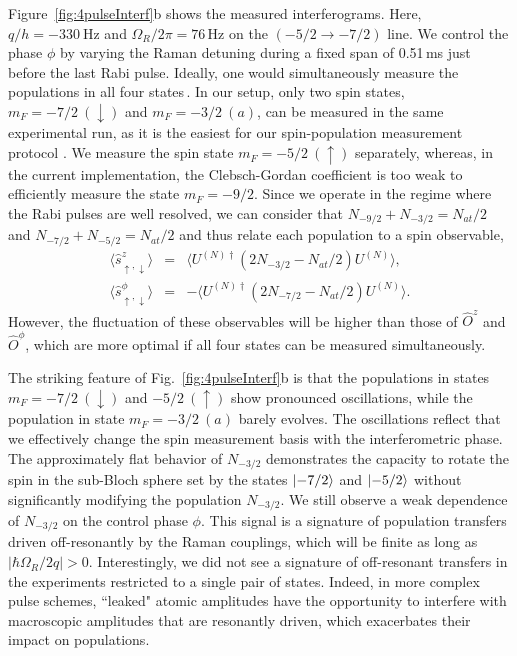 Figure~\ref{fig:4pulseInterf}b shows the measured interferograms. 
Here, $q / h = \SI{-330}{\hertz}$ and $\Omega_R/2\pi = 76$\,Hz on the $(-5/2 \rightarrow -7/2)$ line. We control the phase $\phi$ by varying the Raman detuning during a fixed span of {0.51\,ms} just before the last Rabi pulse. Ideally, one would simultaneously measure the populations in all four states\,\cite{Taie2010roa, Stellmer2011dam}. 
In our setup, only two spin states, $m_F =-7/2~(\downarrow)$ and $m_F = -3/2~(a)$, can be measured in the same experimental run, as it is the easiest for our spin-population measurement protocol \cite{Bataille2020}. We measure the spin state $m_F =-5/2~(\uparrow)$ separately, whereas, in the current implementation, the Clebsch-Gordan coefficient is too weak to efficiently measure the state $m_F =-9/2$. 
Since we operate in the regime where the Rabi pulses are well resolved, we can consider that $N_{-9/2}+N_{-3/2} = N_{at}/2$ and $N_{-7/2}+N_{-5/2} = N_{at}/2$ and thus relate each population to a spin observable,
\begin{eqnarray}
 \langle  \hat{s}^z_{\uparrow,\downarrow} \rangle & =& \langle U^{(N)\dagger} \left(2 N_{-3/2} - N_{at}/2 \right) U^{(N)} \rangle, \\
  \langle  \hat{s}^\phi_{\uparrow,\downarrow} \rangle & =& - \langle U^{(N)\dagger} \left( 2 N_{-7/2} - N_{at}/2 \right) U^{(N)}\rangle.
\end{eqnarray}
However, the fluctuation of these observables will be higher than those of $\hat{O}^z$ and $\hat{O}^\phi$, which are more optimal if all four states can be measured simultaneously. 

The striking feature of Fig.~\ref{fig:4pulseInterf}b is that the populations in states $m_F= -7/2~(\downarrow)$ and $-5/2~(\uparrow)$ show pronounced oscillations, while the population in state $m_F =-3/2~(a)$ barely evolves. The oscillations reflect that we effectively change the spin measurement basis with the interferometric phase. The approximately flat behavior of $N_{-3/2}$ demonstrates the capacity to rotate the spin in the sub-Bloch sphere set by the states $\ket{-7/2}$ and $\ket{-5/2}$ without significantly modifying the population $N_{-3/2}$. We still observe a weak dependence of $N_{-3/2}$ on the control phase $\phi$. This signal is a signature of population transfers driven off-resonantly by the Raman couplings, which will be finite as long as $\left| \hbar \Omega_R / 2 q \right| >0$. Interestingly, we did not see a signature of off-resonant transfers in the experiments restricted to a single pair of states. Indeed, in more complex pulse schemes, ``leaked" atomic amplitudes have the opportunity to interfere with macroscopic amplitudes that are resonantly driven, which exacerbates their impact on populations. 

